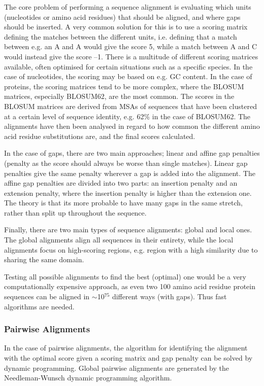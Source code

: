 \documentclass[a4paper, twoside, 12pt, openright]{report}
\begin{document}
The core problem of performing a sequence alignment is evaluating which units (nucleotides or amino acid residues) that should be aligned, and where gaps should be inserted. A very common solution for this is to use a scoring matrix defining the matches between the different units, i.e. defining that a match between e.g. an A and A would give the score 5, while a match between A and C would instead give the score --1. There is a multitude of different scoring matrices available, often optimised for certain situations such as a specific species. In the case of nucleotides, the scoring may be based on e.g. GC content. In the case of proteins, the scoring matrices tend to be more complex, where the BLOSUM matrices\cite{henikoff_amino_1992}, especially BLOSUM62, are the most common. The scores in the BLOSUM matrices are derived from MSAs of sequences that have been clustered at a certain level of sequence identity, e.g. 62\% in the case of BLOSUM62. The alignments have then been analysed in regard to how common the different amino acid residue substitutions are, and the final scores calculated.

In the case of gaps, there are two main approaches; linear and affine gap penalties (penalty as the score should always be worse than single matches). Linear gap penalties give the same penalty wherever a gap is added into the alignment. The affine gap penalties are divided into two parts: an insertion penalty and an extension penalty, where the insertion penalty is higher than the extension one. The theory is that its more probable to have many gaps in the same stretch, rather than split up throughout the sequence.

Finally, there are two main types of sequence alignments: global and local ones. The global alignments align all sequences in their entirety, while the local alignments focus on high-scoring regions, e.g. region with a high similarity due to sharing the same domain.

Testing all possible alignments to find the best (optimal) one would be a very computationally expensive approach, as even two 100 amino acid residue protein sequences can be aligned in $\sim$10$^{75}$ different ways (with gaps). Thus fast algorithms are needed.


\subsubsection{Pairwise Alignments}
\label{sec:pairwise}

In the case of pairwise alignments, the algorithm for identifying the alignment with the optimal score given a scoring matrix and gap penalty can be solved by dynamic programming. Global pairwise alignments are generated by the Needleman-Wunsch dynamic programming algorithm\cite{needleman_general_1970}. 
\end{document}
